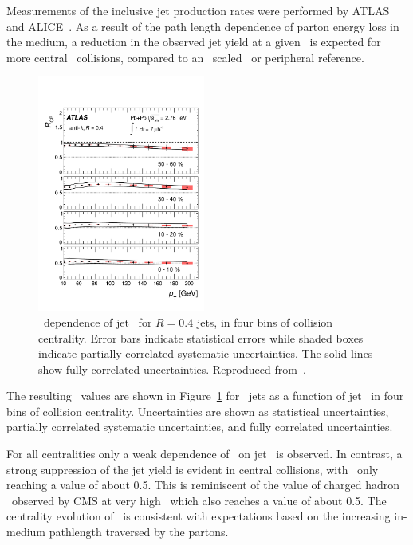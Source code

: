 Measurements of the inclusive jet production rates were performed by ATLAS~\cite{Aad:2012is} and 
ALICE~\cite{Abelev:2013kqa}.
As a result of the path length dependence of parton energy loss in the medium, 
a reduction in the observed jet yield at a given \pT\ is expected for more 
central \PbPb\ collisions, compared to an \Ncoll\ scaled \pp\ or peripheral reference.

\begin{figure}[!th]
\begin{center}
\includegraphics[width=0.49\textwidth]{jetfigures/ATLAS_jetRCP_04.pdf}
\caption{
\pT\ dependence of jet \Rcp\ for  $R=0.4$ jets,
in four bins of collision centrality. Error bars indicate
statistical errors while shaded boxes indicate
partially correlated systematic uncertainties. 
The solid lines show fully correlated uncertainties. Reproduced from~\cite{Aad:2012is}.}
\label{fig:GR:rcprfour}
\end{center}
\end{figure}
The resulting \Rcp\ values are shown in Figure~\ref{fig:GR:rcprfour}
for  \RFour\ jets as a function of jet \pT\ in four bins
of collision centrality.
Uncertainties are shown as statistical uncertainties, partially correlated systematic
uncertainties, and fully correlated uncertainties.

For all centralities only a weak dependence of \Rcp\ on jet \pT\ is observed.
In contrast, a strong suppression of the jet yield is evident in
central collisions, with \Rcp\ only reaching a value of about 0.5.
This is reminiscent of the value of charged hadron \Raa\ observed
by CMS at very high \pT\, which also reaches a value of about 0.5.
The centrality evolution of \Rcp\ is consistent with expectations
based on the increasing in-medium pathlength traversed by the partons.

